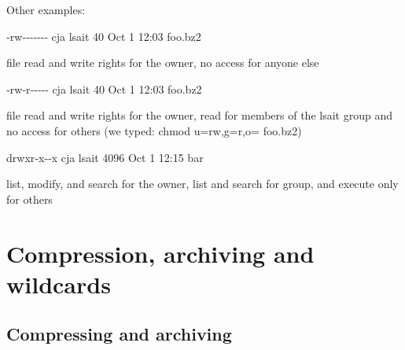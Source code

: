 \documentclass{beamer}[10pt, usepdftitle=false, handout]
\begin{document}
	\begin{frame}
	
	Other examples:
	\vspace*{1em}	
	
	‐rw‐‐‐‐‐‐‐ cja lsait 40 Oct 1 12:03 foo.bz2
	\vspace*{0.2em}
	
	file read and write rights for the owner, no access for
anyone else 
	\vspace*{1em}
	
	‐rw‐r‐‐‐‐‐ cja lsait 40 Oct 1 12:03 foo.bz2
	\vspace*{0.2em}
	
	file read and write rights for the owner, read for
	members of the lsait group and no access for others
	(we typed: chmod u=rw,g=r,o= foo.bz2)
	\vspace*{1em}

	drwxr‐x‐‐x cja lsait 4096 Oct 1 12:15 bar
	\vspace*{0.2em}
	
	list, modify, and search for the owner, list and search
	for group, and execute only for others
	
	\end{frame}
	
%	
%	
%	
%	
%	
%
%		

	\section{Compression, archiving and wildcards}
	
	\subsection{Compressing and archiving}
	
\end{document}
